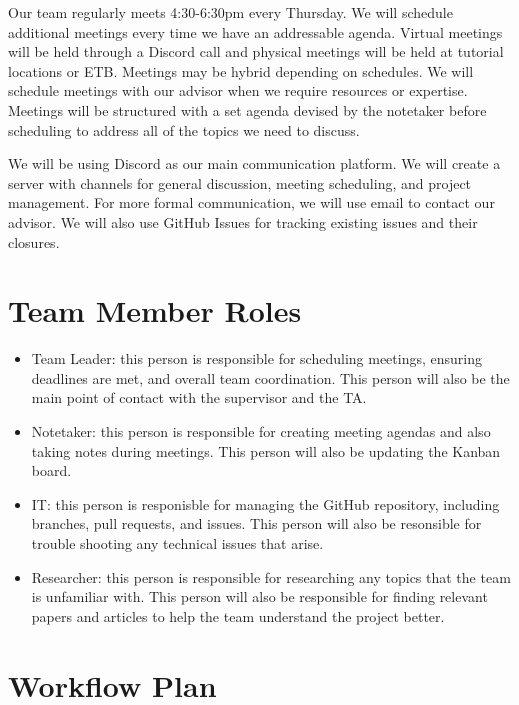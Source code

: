 \documentclass{article}
\begin{document}
\raggedright
Our team regularly meets 4:30-6:30pm every Thursday.
We will schedule additional meetings every time we have an addressable 
agenda. Virtual meetings will be held through a Discord call 
and physical meetings will be held at tutorial locations or ETB.
 Meetings may be hybrid depending on schedules. We will schedule
  meetings with our advisor when we require resources or 
  expertise. Meetings will be structured with a set agenda devised by the notetaker
  before scheduling to address all of the topics we need to discuss.

\medskip

\raggedright
We will be using Discord as our main communication 
platform. We will create a server with channels for general 
discussion, meeting scheduling, and project management.
For more formal communication, we will use email to contact 
our advisor.
We will also use GitHub Issues for tracking existing 
issues and their closures.

\section{Team Member Roles}

\raggedright
\begin{itemize}
  \item Team Leader: this person is responsible for scheduling meetings,
    ensuring deadlines are met, and overall team coordination. This person will
    also be the main point of contact with the supervisor and the TA.
  \item Notetaker: this person is responsible for creating meeting agendas and also
    taking notes during meetings. This person will also be updating the Kanban
    board.
  \item IT: this person is responisble for managing the GitHub repository, including
    branches, pull requests, and issues. This person will also be resonsible for trouble
    shooting any technical issues that arise.
  \item Researcher: this person is responsible for researching any topics that
    the team is unfamiliar with. This person will also be responsible for finding
    relevant papers and articles to help the team understand the project better.
\end{itemize}

\section{Workflow Plan}
\end{document}
